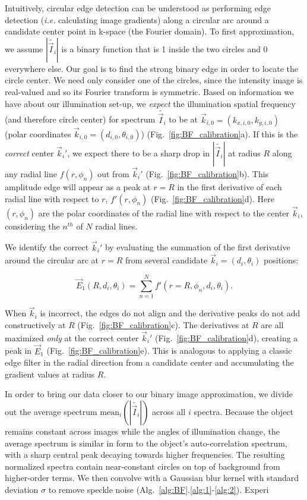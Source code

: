 Intuitively, circular edge detection can be understood as performing edge detection (\textit{i.e.} calculating image gradients) along a circular arc around a candidate center point in k-space (the Fourier domain). To first approximation, we assume $|\tilde{\vec{I}_i}|$ is a binary function that is 1 inside the two circles and 0 everywhere else. Our goal is to find the strong binary edge in order to locate the circle center.  We need only consider one of the circles, since the intensity image is real-valued and so its Fourier transform is symmetric. Based on information we have about our illumination set-up, we \textit{expect} the illumination spatial frequency (and therefore circle center) for spectrum $\tilde{\vec{I}_i}$ to be at $\vec{k}_{i,0} = (k_{x,i,0},k_{y,i,0})$ (polar coordinates $\vec{k}_{i,0} = (d_{i,0}, \theta_{i,0})$) (Fig.~\ref{fig:BF_calibration}a). If this is the \textit{correct} center  $\vec{k}_i'$, we expect there to be a sharp drop in $|\tilde{\vec{I}_i}|$ at radius $R$ along any radial line $f(r,\phi_n)$ out from $\vec{k}_i'$ (Fig.~\ref{fig:BF_calibration}b). This amplitude edge will appear as a peak at $r=R$ in the first derivative of each radial line with respect to $r$, $f'(r,\phi_n)$ (Fig.~\ref{fig:BF_calibration}d). Here $(r,\phi_n)$ are the polar coordinates of the radial line with respect to the center $\vec{k}_i$, considering the $n^{th}$ of $N$ radial lines. 

We identify the correct $\vec{k}_i'$ by evaluating the summation of the first derivative around the circular arc at $r=R$ from several candidate $\vec{k}_i = (d_i,\theta_i)$ positions:

\begin{equation}
\vec{E}_1(R, d_i,\theta_i)=\sum_{n=1}^{N} f'(r = R,\phi_n,d_i,\theta_i).
\label{eq:eprime}
\end{equation}

\noindent When $\vec{k}_i$ is incorrect, the edges do not align and the derivative peaks do not add constructively at $R$ (Fig.~\ref{fig:BF_calibration}c). The derivatives at $R$ are all maximized \textit{only} at the correct center $\vec{k}_i'$ (Fig.~\ref{fig:BF_calibration}d), creating a peak in $\vec{E}_1$ (Fig.~\ref{fig:BF_calibration}e). This is analogous to applying a classic edge filter in the radial direction from a candidate center and accumulating the gradient values at radius $R$.

In order to bring our data closer to our binary image approximation, we divide out the average spectrum $\mathrm{mean}_i(|\tilde{\vec{I}_i}|)$ across all $i$ spectra. Because the object remains constant across images while the angles of illumination change, the average spectrum is similar in form to the object's auto-correlation spectrum, with a sharp central peak decaying towards higher frequencies. The resulting normalized spectra contain near-constant circles on top of background from higher-order terms. We then convolve with a Gaussian blur kernel with standard deviation $\sigma$ to remove speckle noise (Alg.~\ref{alg:BF}.\ref{alg:1}-\ref{alg:2}). Experi

